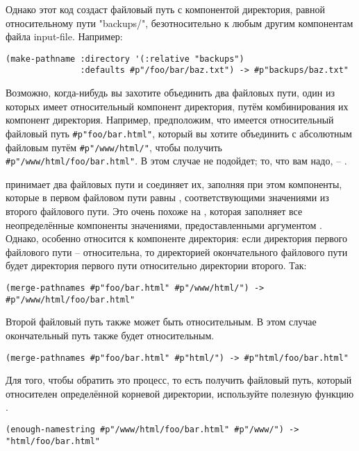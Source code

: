 Однако этот код создаст файловый путь с компонентой директория, равной относительному пути
"backups/", безотносительно к любым другим компонентам файла input-file. Например:

\begin{lstlisting}
(make-pathname :directory '(:relative "backups") 
               :defaults #p"/foo/bar/baz.txt") -> #p"backups/baz.txt" 
\end{lstlisting}

Возможно, когда-нибудь вы захотите объединить два файловых пути, один из которых имеет
относительный компонент директория, путём комбинирования их компонент
директория. Например, предположим, что имеется относительный файловый путь
\lstinline!#p"foo/bar.html"!, который вы хотите объединить с абсолютным файловым путём
\lstinline!#p"/www/html/"!, чтобы получить \lstinline!#p"/www/html/foo/bar.html"!. В этом
случае  не подойдет; то, что вам надо, -- .

 принимает два файловых пути и соединяет их, заполняя при этом
компоненты, которые в первом файловом пути равны , соответствующими значениями
из второго файлового пути. Это очень похоже на , которая заполняет все
неопределённые компоненты значениями, предоставленными аргументом
. Однако,  особенно относится к компоненте
директория: если директория первого файлового пути -- относительна, то директорией
окончательного файлового пути будет директория первого пути относительно директории
второго. Так:

\begin{lstlisting}
(merge-pathnames #p"foo/bar.html" #p"/www/html/") -> #p"/www/html/foo/bar.html" 
\end{lstlisting}

Второй файловый путь также может быть относительным. В этом случае окончательный путь
также будет относительным.

\begin{lstlisting}
(merge-pathnames #p"foo/bar.html" #p"html/") -> #p"html/foo/bar.html" 
\end{lstlisting}

Для того, чтобы обратить это процесс, то есть получить файловый путь, который относителен
определённой корневой директории, используйте полезную функцию .

\begin{lstlisting}
(enough-namestring #p"/www/html/foo/bar.html" #p"/www/") -> "html/foo/bar.html" 
\end{lstlisting}

